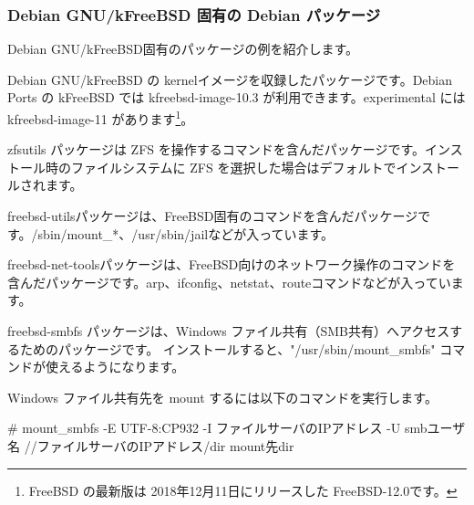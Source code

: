\documentclass[mingoth,a4paper]{jsarticle}
\begin{document}
\subsubsection{Debian GNU/kFreeBSD 固有の Debian パッケージ}

Debian GNU/kFreeBSD固有のパッケージの例を紹介します。


Debian GNU/kFreeBSD の kernelイメージを収録したパッケージです。Debian Ports の kFreeBSD では kfreebsd-image-10.3 が利用できます。experimental には kfreebsd-image-11 があります\footnote{FreeBSD の最新版は 2018年12月11日にリリースした FreeBSD-12.0です。}。


zfsutils パッケージは ZFS を操作するコマンドを含んだパッケージです。インストール時のファイルシステムに ZFS を選択した場合はデフォルトでインストールされます。

%


freebsd-utilsパッケージは、FreeBSD固有のコマンドを含んだパッケージです。/sbin/mount\_*、/usr/sbin/jailなどが入っています。


freebsd-net-toolsパッケージは、FreeBSD向けのネットワーク操作のコマンドを含んだパッケージです。arp、ifconfig、netstat、routeコマンドなどが入っています。


freebsd-smbfs パッケージは、Windows ファイル共有（SMB共有）へアクセスするためのパッケージです。
インストールすると、"/usr/sbin/mount\_smbfs" コマンドが使えるようになります。

Windows ファイル共有先を mount するには以下のコマンドを実行します。

\begin{commandline}
# mount_smbfs -E UTF-8:CP932 -I {ファイルサーバのIPアドレス} -U {smbユーザ名} //{ファイルサーバのIPアドレス}/{dir} {mount先dir}
\end{commandline}

\end{document}
